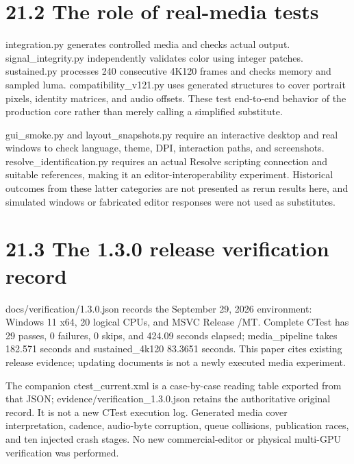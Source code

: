 \documentclass[11pt,a4paper,openany]{book}
\begin{document}
\section*{21.2 The role of real-media tests}
integration.py generates controlled media and checks actual output. signal\_integrity.py independently validates color using integer patches. sustained.py processes 240 consecutive 4K120 frames and checks memory and sampled luma. compatibility\_v121.py uses generated structures to cover portrait pixels, identity matrices, and audio offsets. These test end-to-end behavior of the production core rather than merely calling a simplified substitute.

gui\_smoke.py and layout\_snapshots.py require an interactive desktop and real windows to check language, theme, DPI, interaction paths, and screenshots. resolve\_identification.py requires an actual Resolve scripting connection and suitable references, making it an editor-interoperability experiment. Historical outcomes from these latter categories are not presented as rerun results here, and simulated windows or fabricated editor responses were not used as substitutes.


\section*{21.3 The 1.3.0 release verification record}
docs/verification/1.3.0.json records the September 29, 2026 environment: Windows 11 x64, 20 logical CPUs, and MSVC Release /MT. Complete CTest has 29 passes, 0 failures, 0 skips, and 424.09 seconds elapsed; media\_pipeline takes 182.571 seconds and sustained\_4k120 83.3651 seconds. This paper cites existing release evidence; updating documents is not a newly executed media experiment.

The companion ctest\_current.xml is a case-by-case reading table exported from that JSON; evidence/verification\_1.3.0.json retains the authoritative original record. It is not a new CTest execution log. Generated media cover interpretation, cadence, audio-byte corruption, queue collisions, publication races, and ten injected crash stages. No new commercial-editor or physical multi-GPU verification was performed.
\end{document}
